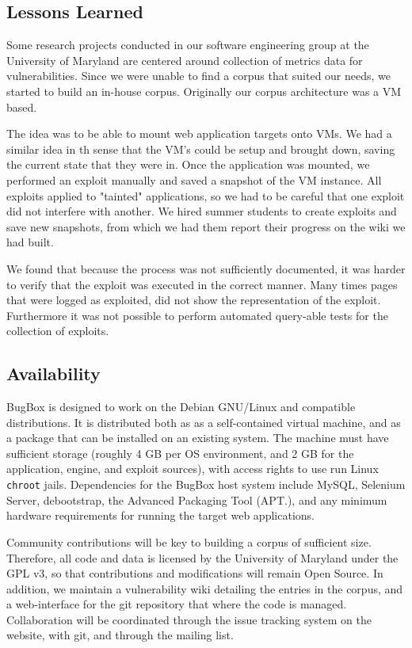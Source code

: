 \documentclass[letterpaper,twocolumn,10pt]{article}
\begin{document}
\subsection{Lessons Learned}

Some research projects conducted in our software engineering group at the University of Maryland are centered around collection of metrics data for vulnerabilities.  Since we were unable to find a corpus that suited our needs, we started to build an in-house corpus.  Originally our corpus architecture was a VM based. \par
The idea was to be able to mount web application targets onto VMs.  We had a similar idea in th sense that the VM's could be setup and brought down, saving the current state that they were in.  Once the application was mounted, we performed an exploit manually and saved a snapshot of the VM instance.  All exploits applied to "tainted" applications, so we had to be careful that one exploit did not interfere with another.  We hired summer students to create exploits and save new snapshots, from which we had them report their progress on the wiki we had built.\par
We found that because the process was not sufficiently documented, it was harder to verify that the exploit was executed in the correct manner.  Many times pages that were logged as exploited, did not show the representation of the exploit. Furthermore it was not possible to perform automated query-able tests for the collection of exploits.\par

\subsection{Availability}

BugBox is designed to work on the Debian GNU/Linux and compatible distributions.  It is distributed both as as a self-contained virtual machine, and as a package that can be installed on an existing system. The machine must have sufficient storage (roughly 4 GB per OS environment, and 2 GB for the application, engine, and exploit sources), with access rights to use run Linux {\tt chroot} jails.  Dependencies for the BugBox host system include MySQL, Selenium Server, debootstrap, the Advanced Packaging Tool (APT.), and any minimum hardware requirements for running the target web applications.\par

Community contributions will be key to building a corpus of sufficient size. Therefore, all code and data is licensed by the University of Maryland under the GPL v3, so that contributions and modifications will remain Open Source. In addition, we maintain a vulnerability wiki detailing the entries in the corpus, and a web-interface for the git repository that where the code is managed. Collaboration will be coordinated through the issue tracking system on the website, with git, and through the mailing list. \par
\end{document}
